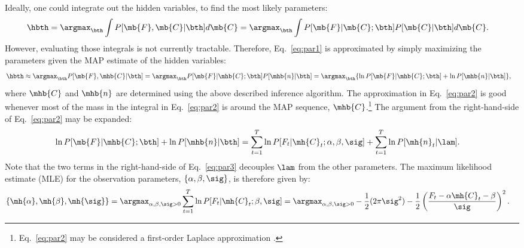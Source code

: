 Ideally, one could integrate out the hidden variables, to find the most likely parameters:
\begin{align} \label{eq:par1}
\hbth &= \argmax_{\bth} \int P[\mb{F}, \mb{C} | \bth] d\mb{C}  = \argmax_{\bth} \int P[\mb{F} | \mb{C}; \bth] P[\mb{C} | \bth] d\mb{C}.
\end{align}
However, evaluating those integrals is not currently tractable.
Therefore, Eq.~\eqref{eq:par1} is approximated by simply maximizing the parameters given the MAP estimate of the hidden variables:
\begin{align} \label{eq:par2}
\hbth &\approx \argmax_{\bth} P[\mb{F}, \mhb{C} | \bth] = \argmax_{\bth} P[\mb{F}| \mhb{C}; \bth] P[\mhb{n} | \bth] = \argmax_{\bth} \{ \ln P[\mb{F} | \mhb{C}; \bth] + \ln P[\mhb{n} | \bth] \}, 
\end{align}
\noindent where $\mhb{C}$ and $\mhb{n}$ are determined using the above described inference algorithm. The approximation in Eq.~\eqref{eq:par2} is good whenever most of the mass in the integral in Eq.~\eqref{eq:par2} is around the MAP sequence, $\mhb{C}$.\footnote{Eq.~\eqref{eq:par2} may be considered a first-order Laplace approximation \cite{KassRaftery95}.}  The argument from the right-hand-side of Eq.~\eqref{eq:par2} may be expanded: 
\begin{align} \label{eq:par3}
\ln P[\mb{F}| \mhb{C}; \bth] + \ln P[\mhb{n} | \bth] &= \sum_{t=1}^T \ln P[F_t | \mh{C}_t; \alpha, \beta,\sig] + \sum_{t=1}^T \ln P[\mh{n}_t | \lam].
\end{align}
\noindent Note that the two terms in the right-hand-side of Eq.~\eqref{eq:par3} decouples $\lam$ from the other parameters.  The maximum likelihood estimate (MLE) for the observation parameters, $\{\alpha,\beta,\sig\}$, is therefore given by:
\begin{align} \label{eq:beta,sig}
	\{\mh{\alpha}, \mh{\beta},\mh{\sig}\} &=  \argmax_{\alpha, \beta,\sig >0} \sum_{t=1}^T \ln P[F_t | \mh{C}_t; \beta,\sig]
	=  \argmax_{\alpha, \beta,\sig >0} 	-\frac{1}{2} (2\pi \sig^2) - \frac{1}{2} \left(\frac{F_t-\alpha \mh{C}_t -\beta}{\sig}\right)^2. %
\end{align}

